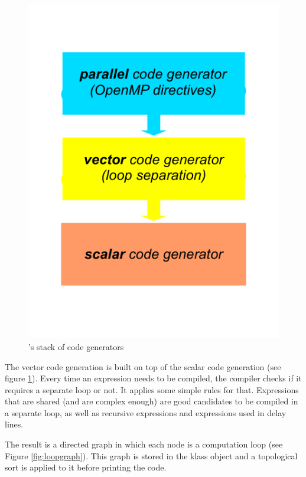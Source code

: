 \begin{figure}[htb]
  \centering
  \includegraphics[scale=0.75]{images/compiler-stack}
  \caption{\faust's stack of code generators}   
  \label{fig:stack}
\end{figure}

The vector code generation is built on top of the scalar code generation (see figure \ref{fig:stack}). Every time an expression needs to be compiled, the compiler checks if it requires a separate loop or not. It applies some simple rules for that. Expressions that are shared (and are complex enough) are good candidates to be compiled in a separate loop, as well as recursive expressions and expressions used in delay lines. 

The result is a directed graph in which each node is a computation loop (see Figure \ref{fig:loopgraph}). This graph is stored in the klass object and a topological sort is applied to it before printing the code. 

